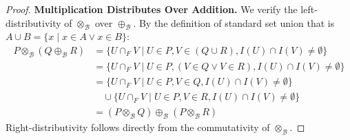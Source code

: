 \documentclass[
]{ceurart}
\theoremstyle{plain}
\begin{document}
\begin{proof}
    \textbf{Multiplication Distributes Over Addition.} We verify the left-distributivity of $\otimes_\mathcal{B}$ over $\oplus_\mathcal{B}$. By the definition of standard set union that is $A \cup B = \{x \mid x \in A \lor x \in B\}$:
    \begin{align*}
        P \otimes_\mathcal{B} (Q \oplus_\mathcal{B} R)
        &= \{U \cap_F V \mid U\in P, V\in (Q \cup R), I(U) \cap I(V) \neq \emptyset \} \\
        &= \{U \cap_F V \mid U\in P, (V\in Q \lor V\in R), I(U) \cap I(V) \neq \emptyset \} \\
        &= \{U \cap_F V \mid U\in P, V\in Q, I(U) \cap I(V) \neq \emptyset \} \\
        &\quad \cup \{U \cap_F V \mid U\in P, V\in R, I(U) \cap I(V) \neq \emptyset \} \\
        &= (P \otimes_\mathcal{B} Q) \oplus_\mathcal{B} (P \otimes_\mathcal{B} R)
    \end{align*}
    Right-distributivity follows directly from the commutativity of $\otimes_\mathcal{B}$.
\end{proof}
\end{document}
